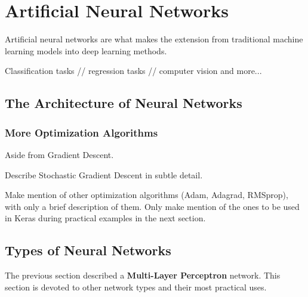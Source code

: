\chapter{Artificial Neural Networks}

Artificial neural networks are what makes the extension from traditional machine learning models into deep learning methods.

Classification tasks // regression tasks // computer vision and more...

\section{The Architecture of Neural Networks} %

  





\subsection{More Optimization Algorithms}

Aside from Gradient Descent.

Describe Stochastic Gradient Descent in subtle detail.

Make mention of other optimization algorithms (Adam, Adagrad, RMSprop), with only a brief description of them.  Only make mention of the ones to be used in Keras during practical examples in the next section.

\section{Types of Neural Networks} %
The previous section described a \textbf{Multi-Layer Perceptron} network.  This section is devoted to other network types and their most practical uses. 

